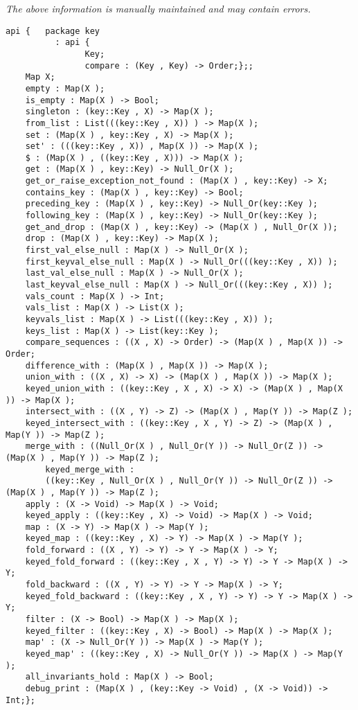 \label{api:Map}

{\tiny \it The above information is manually maintained and may contain errors.}
\begin{verbatim}
api {   package key
          : api {
                Key;
                compare : (Key , Key) -> Order;};;
    Map X;
    empty : Map(X );
    is_empty : Map(X ) -> Bool;
    singleton : (key::Key , X) -> Map(X );
    from_list : List(((key::Key , X)) ) -> Map(X );
    set : (Map(X ) , key::Key , X) -> Map(X );
    set' : (((key::Key , X)) , Map(X )) -> Map(X );
    $ : (Map(X ) , ((key::Key , X))) -> Map(X );
    get : (Map(X ) , key::Key) -> Null_Or(X );
    get_or_raise_exception_not_found : (Map(X ) , key::Key) -> X;
    contains_key : (Map(X ) , key::Key) -> Bool;
    preceding_key : (Map(X ) , key::Key) -> Null_Or(key::Key );
    following_key : (Map(X ) , key::Key) -> Null_Or(key::Key );
    get_and_drop : (Map(X ) , key::Key) -> (Map(X ) , Null_Or(X ));
    drop : (Map(X ) , key::Key) -> Map(X );
    first_val_else_null : Map(X ) -> Null_Or(X );
    first_keyval_else_null : Map(X ) -> Null_Or(((key::Key , X)) );
    last_val_else_null : Map(X ) -> Null_Or(X );
    last_keyval_else_null : Map(X ) -> Null_Or(((key::Key , X)) );
    vals_count : Map(X ) -> Int;
    vals_list : Map(X ) -> List(X );
    keyvals_list : Map(X ) -> List(((key::Key , X)) );
    keys_list : Map(X ) -> List(key::Key );
    compare_sequences : ((X , X) -> Order) -> (Map(X ) , Map(X )) -> Order;
    difference_with : (Map(X ) , Map(X )) -> Map(X );
    union_with : ((X , X) -> X) -> (Map(X ) , Map(X )) -> Map(X );
    keyed_union_with : ((key::Key , X , X) -> X) -> (Map(X ) , Map(X )) -> Map(X );
    intersect_with : ((X , Y) -> Z) -> (Map(X ) , Map(Y )) -> Map(Z );
    keyed_intersect_with : ((key::Key , X , Y) -> Z) -> (Map(X ) , Map(Y )) -> Map(Z );
    merge_with : ((Null_Or(X ) , Null_Or(Y )) -> Null_Or(Z )) -> (Map(X ) , Map(Y )) -> Map(Z );
        keyed_merge_with :
        ((key::Key , Null_Or(X ) , Null_Or(Y )) -> Null_Or(Z )) -> (Map(X ) , Map(Y )) -> Map(Z );
    apply : (X -> Void) -> Map(X ) -> Void;
    keyed_apply : ((key::Key , X) -> Void) -> Map(X ) -> Void;
    map : (X -> Y) -> Map(X ) -> Map(Y );
    keyed_map : ((key::Key , X) -> Y) -> Map(X ) -> Map(Y );
    fold_forward : ((X , Y) -> Y) -> Y -> Map(X ) -> Y;
    keyed_fold_forward : ((key::Key , X , Y) -> Y) -> Y -> Map(X ) -> Y;
    fold_backward : ((X , Y) -> Y) -> Y -> Map(X ) -> Y;
    keyed_fold_backward : ((key::Key , X , Y) -> Y) -> Y -> Map(X ) -> Y;
    filter : (X -> Bool) -> Map(X ) -> Map(X );
    keyed_filter : ((key::Key , X) -> Bool) -> Map(X ) -> Map(X );
    map' : (X -> Null_Or(Y )) -> Map(X ) -> Map(Y );
    keyed_map' : ((key::Key , X) -> Null_Or(Y )) -> Map(X ) -> Map(Y );
    all_invariants_hold : Map(X ) -> Bool;
    debug_print : (Map(X ) , (key::Key -> Void) , (X -> Void)) -> Int;};
\end{verbatim}
